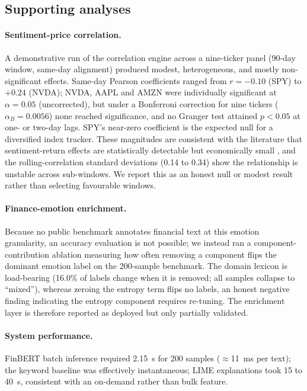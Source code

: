 \documentclass{aims}
\numberwithin{equation}{section}
\begin{document}
\subsection{Supporting analyses}
\paragraph{Sentiment-price correlation.}
A demonstrative run of the correlation engine across a nine-ticker panel (90-day
window, same-day alignment) produced modest, heterogeneous, and mostly
non-significant effects. Same-day Pearson coefficients ranged from $r = -0.10$ (SPY)
to $+0.24$ (NVDA); NVDA, AAPL and AMZN were individually significant at
$\alpha = 0.05$ (uncorrected), but under a Bonferroni correction for nine tickers
($\alpha_B = 0.0056$) none reached significance, and no Granger test attained
$p < 0.05$ at one- or two-day lags. SPY's near-zero coefficient is the expected null
for a diversified index tracker. These magnitudes are consistent with the literature
that sentiment-return effects are statistically detectable but economically small
\citep{tetlock2007,kraaijeveld2020}, and the rolling-correlation standard deviations
(0.14 to 0.34) show the relationship is unstable across sub-windows. We report this
as an honest null or modest result rather than selecting favourable windows.

\paragraph{Finance-emotion enrichment.}
Because no public benchmark annotates financial text at this emotion granularity, an
accuracy evaluation is not possible; we instead ran a component-contribution
ablation measuring how often removing a component flips the dominant emotion label on
the 200-sample benchmark. The domain lexicon is load-bearing (16.0\% of labels change
when it is removed; all samples collapse to ``mixed''), whereas zeroing the entropy
term flips no labels, an honest negative finding indicating the entropy component
requires re-tuning. The enrichment layer is therefore reported as deployed but only
partially validated.

\paragraph{System performance.}
FinBERT batch inference required 2.15~s for 200 samples ($\approx$11~ms per text);
the keyword baseline was effectively instantaneous; LIME explanations took 15 to
40~s, consistent with an on-demand rather than bulk feature.
\end{document}

